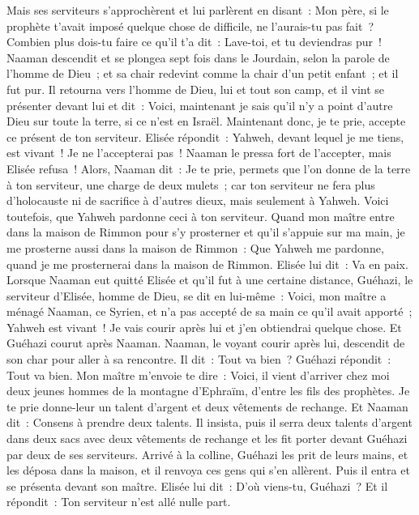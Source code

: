 \begin{multicols}{2}
Mais ses serviteurs s'approchèrent et lui parlèrent en disant~: Mon père, si le prophète t'avait imposé quelque chose de difficile, ne l'aurais-tu pas fait~? Combien plus dois-tu faire ce qu'il t'a dit~: Lave-toi, et tu deviendras pur~!
Naaman descendit et se plongea sept fois dans le Jourdain, selon la parole de l'homme de Dieu~; et sa chair redevint comme la chair d'un petit enfant~; et il fut pur.
Il retourna vers l'homme de Dieu, lui et tout son camp, et il vint se présenter devant lui et dit~: Voici, maintenant je sais qu'il n'y a point d'autre Dieu sur toute la terre, si ce n'est en Israël. Maintenant donc, je te prie, accepte ce présent de ton serviteur.
Elisée répondit~: Yahweh, devant lequel je me tiens, est vivant~! Je ne l'accepterai pas~! Naaman le pressa fort de l'accepter, mais Elisée refusa~!
Alors, Naaman dit~: Je te prie, permets que l'on donne de la terre à ton serviteur, une charge de deux mulets~; car ton serviteur ne fera plus d'holocauste ni de sacrifice à d'autres dieux, mais seulement à Yahweh.
Voici toutefois, que Yahweh pardonne ceci à ton serviteur. Quand mon maître entre dans la maison de Rimmon pour s'y prosterner et qu'il s'appuie sur ma main, je me prosterne aussi dans la maison de Rimmon~: Que Yahweh me pardonne, quand je me prosternerai dans la maison de Rimmon.
Elisée lui dit~: Va en paix. Lorsque Naaman eut quitté Elisée et qu'il fut à une certaine distance,
Guéhazi, le serviteur d'Elisée, homme de Dieu, se dit en lui-même~: Voici, mon maître a ménagé Naaman, ce Syrien, et n'a pas accepté de sa main ce qu'il avait apporté~; Yahweh est vivant~! Je vais courir après lui et j'en obtiendrai quelque chose.
Et Guéhazi courut après Naaman. Naaman, le voyant courir après lui, descendit de son char pour aller à sa rencontre. Il dit~: Tout va bien~?
Guéhazi répondit~: Tout va bien. Mon maître m'envoie te dire~: Voici, il vient d'arriver chez moi deux jeunes hommes de la montagne d'Ephraïm, d'entre les fils des prophètes. Je te prie donne-leur un talent d'argent et deux vêtements de rechange.
Et Naaman dit~: Consens à prendre deux talents. Il insista, puis il serra deux talents d'argent dans deux sacs avec deux vêtements de rechange et les fit porter devant Guéhazi par deux de ses serviteurs.
Arrivé à la colline, Guéhazi les prit de leurs mains, et les déposa dans la maison, et il renvoya ces gens qui s'en allèrent.
Puis il entra et se présenta devant son maître. Elisée lui dit~: D'où viens-tu, Guéhazi~? Et il répondit~: Ton serviteur n'est allé nulle part.

\end{multicols}
